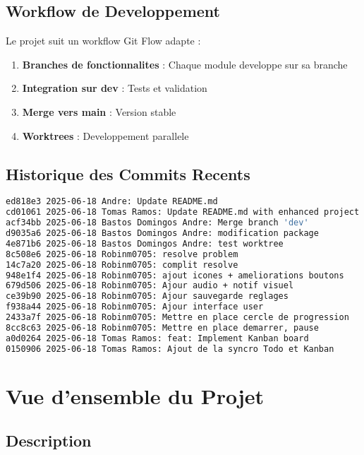 \documentclass[12pt,a4paper]{article}
\begin{document}
\subsection{Workflow de Developpement}

Le projet suit un workflow Git Flow adapte :

\begin{enumerate}
    \item \textbf{Branches de fonctionnalites} : Chaque module developpe sur sa branche
    \item \textbf{Integration sur dev} : Tests et validation
    \item \textbf{Merge vers main} : Version stable
    \item \textbf{Worktrees} : Developpement parallele
\end{enumerate}

\subsection{Historique des Commits Recents}

\begin{lstlisting}[language=bash, caption=Historique des 15 derniers commits]
ed818e3 2025-06-18 Andre: Update README.md
cd01061 2025-06-18 Tomas Ramos: Update README.md with enhanced project description
acf34bb 2025-06-18 Bastos Domingos Andre: Merge branch 'dev'
d9035a6 2025-06-18 Bastos Domingos Andre: modification package
4e871b6 2025-06-18 Bastos Domingos Andre: test worktree
8c508e6 2025-06-18 Robinm0705: resolve problem
14c7a20 2025-06-18 Robinm0705: complit resolve
948e1f4 2025-06-18 Robinm0705: ajout icones + ameliorations boutons
679d506 2025-06-18 Robinm0705: Ajour audio + notif visuel
ce39b90 2025-06-18 Robinm0705: Ajour sauvegarde reglages
f938a44 2025-06-18 Robinm0705: Ajour interface user
2433a7f 2025-06-18 Robinm0705: Mettre en place cercle de progression
8cc8c63 2025-06-18 Robinm0705: Mettre en place demarrer, pause
a0d0264 2025-06-18 Tomas Ramos: feat: Implement Kanban board
0150906 2025-06-18 Tomas Ramos: Ajout de la syncro Todo et Kanban
\end{lstlisting}

\section{Vue d'ensemble du Projet}

\subsection{Description}
\end{document}
